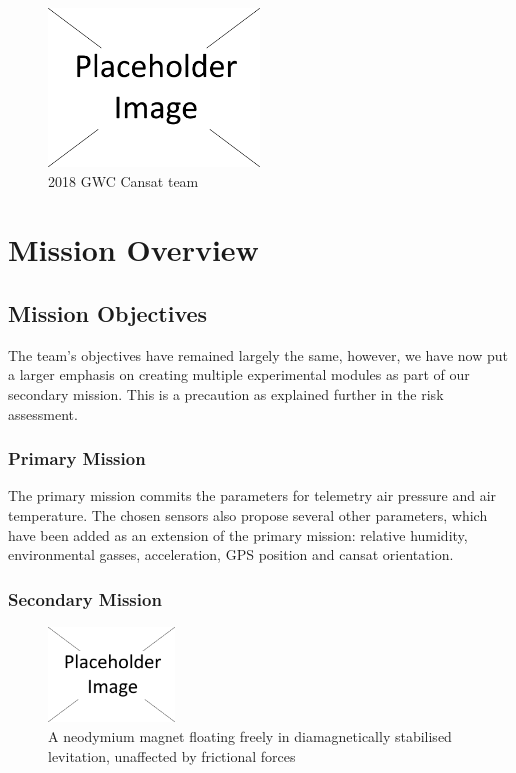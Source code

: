 \documentclass{report}
\begin{document}
		\begin{figure}[H]
			\begin{center}
				\includegraphics[width=0.5\textwidth]{placeholder}
			\end{center}
			\vspace{-15pt}
			\caption{2018 GWC Cansat team}
		\end{figure}

	
	\section{Mission Overview}
		\subsection{Mission Objectives}
		The team's objectives have remained largely the same, however, we have
		now put a larger emphasis on creating multiple experimental modules as part
		of our secondary mission. This is a precaution as explained further in the
		risk assessment.

		\subsubsection{Primary Mission}
		The primary mission commits the parameters for telemetry air pressure and
		air temperature. The chosen sensors also propose several other parameters, 
		which have been added as an extension of the primary mission: relative
		humidity, environmental gasses, acceleration, GPS position and cansat
		orientation.

		\subsubsection{Secondary Mission}

		\begin{figure}
			\vspace{-35pt}
	 		\begin{center}
			\includegraphics[width=0.3\textwidth]{placeholder}
			\end{center}
			\vspace{-15pt}
			\caption{A neodymium magnet floating freely in diamagnetically
			stabilised levitation, unaffected by frictional forces}
		\end{figure}
\end{document}
